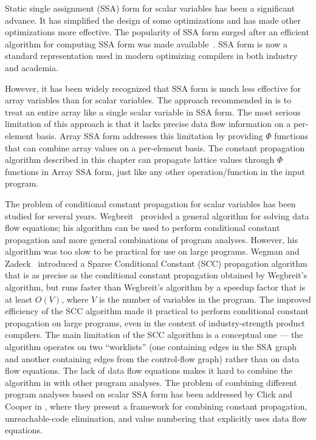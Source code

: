 Static single assignment (SSA) form for scalar variables has been a significant
advance.  It has simplified the design of some optimizations and has made
other optimizations more effective.  
The popularity of SSA form surged
after an efficient algorithm for computing SSA form was made available~\cite{CFRWZ91a}.  SSA form is now a standard representation used in modern
optimizing compilers in both industry and academia.

However, it has been widely recognized that SSA form is much less
effective for array variables than for scalar variables.
The approach recommended in \cite{CFRWZ91a} is to treat an
entire array like a single scalar variable in SSA form.
The most serious limitation of this approach is that it lacks precise
data flow information on a per-element basis.
Array SSA form addresses this limitation by providing $\Phi$
functions that can combine array values on a per-element basis.
The constant propagation algorithm described in this
chapter can  propagate lattice values through $\Phi$ functions 
in Array SSA form,
just
like any other operation/function in the input program.

The problem of conditional constant propagation for 
scalar variables 
has been
studied for several years.  Wegbreit~\cite{Wegb75} provided a general
algorithm for solving data flow equations; his algorithm
can be used to perform conditional constant propagation and
more general combinations of program analyses.
However, his algorithm was too slow to be practical for use on 
large programs.
Wegman and Zadeck~\cite{WeZa91} introduced a Sparse Conditional
Constant (SCC) propagation algorithm that is as precise as the conditional
constant propagation obtained by Wegbreit's algorithm, but runs faster
than Wegbreit's algorithm by a speedup factor that is at least $O(V)$,
where $V$ is the number of variables in the program.  
The improved efficiency of the SCC algorithm made it practical to
perform conditional constant propagation on large programs, even in the
context of industry-strength product compilers.  The main limitation
of the SCC algorithm is a conceptual one --- the algorithm operates
on two ``worklists''
(one containing edges in the SSA graph and another
containing edges from the control-flow graph)
rather than on data flow equations.  The lack of
data flow equations
makes it hard to combine the algorithm in \cite{WeZa91}
with other program analyses.
The problem  of combining different program analyses based on
scalar SSA form has been addressed by Click and
Cooper in \cite{ClCo95}, where they present a framework for 
combining constant propagation, unreachable-code elimination,
and value numbering that explicitly uses data flow equations.

